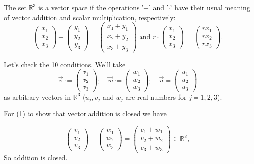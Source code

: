 \begin{example}{}
  The set $\mathbb{R}^3$ is a vector space if the operations '$ + $' and  '$\cdot$' have their usual meaning of vector addition and scalar multiplication, respectively:
\[ \left(\begin{array}{c}x_1\\x_2\\x_3\end{array}\right)+ \left(\begin{array}{c}y_1\\y_2\\y_3\end{array}\right) = \left(\begin{array}{c}x_1+y_1\\x_2+y_2\\x_3+y_3\end{array}\right) \text{ and } r\cdot \left(\begin{array}{c}x_1\\x_2\\x_3\end{array}\right) = \left(\begin{array}{c}rx_1\\rx_2\\rx_3\end{array}\right).\]

Let's check the 10 conditions. We'll take 
\[
\vec{v} := \left(\begin{array}{c}v_1\\v_2\\v_3\end{array}\right);\quad \vec{w} := \left(\begin{array}{c}w_1\\w_2\\w_3\end{array}\right); \quad
\vec{u} = \left(\begin{array}{c}u_1\\u_2\\u_3\end{array}\right)
\]
 as arbitrary vectors in $\mathbb{R}^3$ ($u_j, v_j$ and $w_j$ are real numbers for $j=1,2,3$).


For (1) to show that vector addition is closed  we have

\[ \left(\begin{array}{c}v_1\\v_2\\v_3\end{array}\right) + \left(\begin{array}{c}w_1\\w_2\\w_3\end{array}\right) = \left(\begin{array}{c}v_1+w_1\\v_2+w_2\\v_3+w_3\end{array}\right) \in\mathbb{R}^3,\]
So addition is closed.


\end{example}
